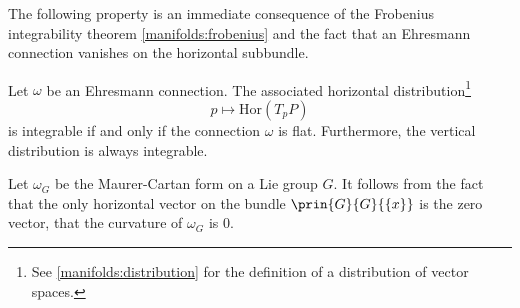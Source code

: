 	The following property is an immediate consequence of the Frobenius integrability theorem \ref{manifolds:frobenius} and the fact that an Ehresmann connection vanishes on the horizontal subbundle.
	\begin{property}
		Let $\omega$ be an Ehresmann connection. The associated horizontal distribution\footnote{See \ref{manifolds:distribution} for the definition of a distribution of vector spaces.}\[p\mapsto\text{Hor}(T_pP)\]is integrable if and only if the connection $\omega$ is flat. Furthermore, the vertical distribution is always integrable.
	\end{property}
	
	\begin{example}
		Let $\omega_G$ be the Maurer-Cartan form on a Lie group $G$. It follows from the fact that the only horizontal vector on the bundle $\prin{G}{G}{\{x\}}$ is the zero vector, that the curvature of $\omega_G$ is 0.
	\end{example}
